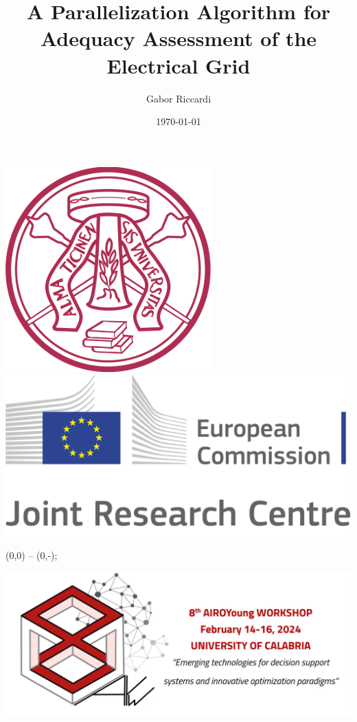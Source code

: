 \documentclass[11pt, aspectratio=169]{beamer}
\title{A Parallelization Algorithm for Adequacy Assessment of the Electrical Grid}
\author{Gabor Riccardi}
\date{\today}
\institute{Università di Pavia}
\begin{document}
\begin{frame}[plain]
  \begin{minipage}{0.3\textwidth}
    \centering
    \includegraphics[width=.6\linewidth]{unipv.png}\\[\baselineskip] %
    \includegraphics[width=.8\linewidth]{EC-JRC-logo.png}
  \end{minipage}%
  \begin{minipage}{0.05\textwidth}
      (0,0) -- (0,-\textheight);
  \end{minipage}%
  \begin{minipage}{0.65\textwidth}
    \maketitle
    \centering
    \includegraphics[width=.6\linewidth]{AIROY.png}
  \end{minipage}    
\end{frame}
\end{document}

